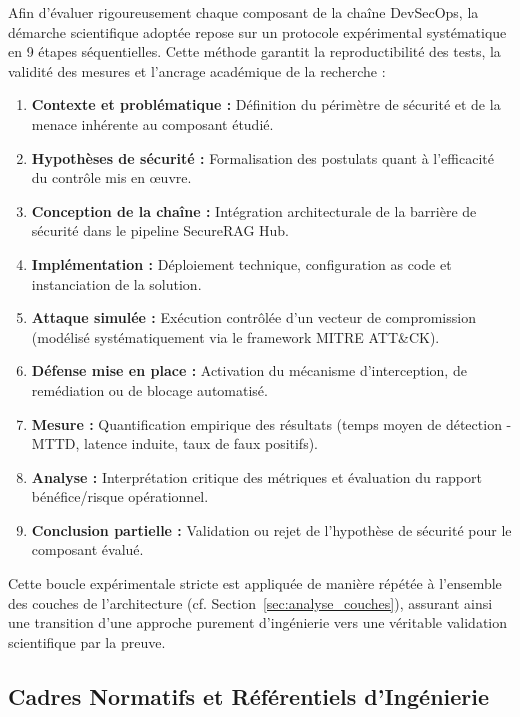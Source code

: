 Afin d'évaluer rigoureusement chaque composant de la chaîne DevSecOps, la démarche scientifique adoptée repose sur un protocole expérimental systématique en 9 étapes séquentielles. Cette méthode garantit la reproductibilité des tests, la validité des mesures et l'ancrage académique de la recherche :

\begin{enumerate}
    \item \textbf{Contexte et problématique :} Définition du périmètre de sécurité et de la menace inhérente au composant étudié.
    \item \textbf{Hypothèses de sécurité :} Formalisation des postulats quant à l'efficacité du contrôle mis en œuvre.
    \item \textbf{Conception de la chaîne :} Intégration architecturale de la barrière de sécurité dans le pipeline SecureRAG Hub.
    \item \textbf{Implémentation :} Déploiement technique, configuration as code et instanciation de la solution.
    \item \textbf{Attaque simulée :} Exécution contrôlée d'un vecteur de compromission (modélisé systématiquement via le framework MITRE ATT\&CK).
    \item \textbf{Défense mise en place :} Activation du mécanisme d'interception, de remédiation ou de blocage automatisé.
    \item \textbf{Mesure :} Quantification empirique des résultats (temps moyen de détection - MTTD, latence induite, taux de faux positifs).
    \item \textbf{Analyse :} Interprétation critique des métriques et évaluation du rapport bénéfice/risque opérationnel.
    \item \textbf{Conclusion partielle :} Validation ou rejet de l'hypothèse de sécurité pour le composant évalué.
\end{enumerate}

Cette boucle expérimentale stricte est appliquée de manière répétée à l'ensemble des couches de l'architecture (cf. Section~\ref{sec:analyse_couches}), assurant ainsi une transition d'une approche purement d'ingénierie vers une véritable validation scientifique par la preuve.

\subsection{Cadres Normatifs et Référentiels d'Ingénierie}

